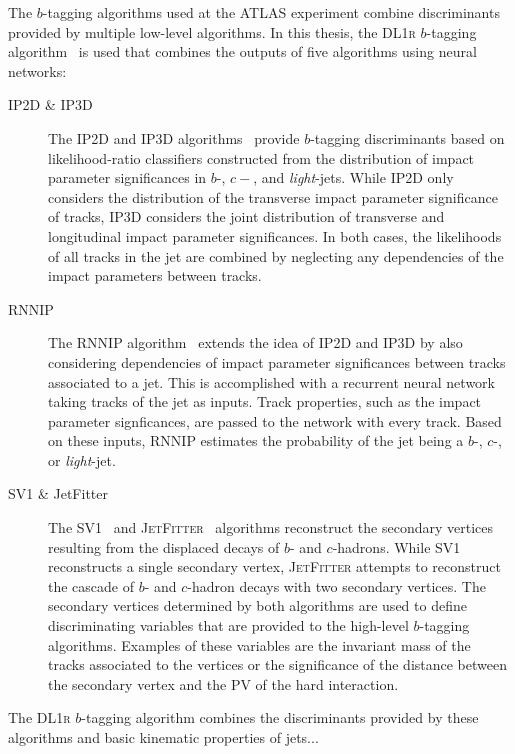 The $b$-tagging algorithms used at the ATLAS experiment combine discriminants
provided by multiple low-level algorithms. In this thesis, the \textsc{DL1r}
$b$-tagging algorithm~\cite{FTAG-2019-07-001} is used that combines the outputs
of five algorithms using neural networks:
\begin{description}

\item[IP2D \& IP3D] The \textsc{IP2D} and \textsc{IP3D}
  algorithms~\cite{ATL-PHYS-PUB-2017-013} provide $b$-tagging discriminants
  based on likelihood-ratio classifiers constructed from the distribution of
  impact parameter significances in $b$-, $c-$, and \emph{light}-jets. While
  \textsc{IP2D} only considers the distribution of the transverse impact
  parameter significance of tracks, \textsc{IP3D} considers the joint
  distribution of transverse and longitudinal impact parameter significances.
  In both cases, the likelihoods of all tracks in the jet are combined by
  neglecting any dependencies of the impact parameters between tracks.

\item[RNNIP] The \textsc{RNNIP} algorithm~\cite{ATL-PHYS-PUB-2017-003} extends
  the idea of \textsc{IP2D} and \textsc{IP3D} by also considering dependencies
  of impact parameter significances between tracks associated to a jet. This is
  accomplished with a recurrent neural network taking tracks of the jet as
  inputs. Track properties, such as the impact parameter signficances, are
  passed to the network with every track. Based on these inputs, \textsc{RNNIP}
  estimates the probability of the jet being a $b$-, $c$-, or \emph{light}-jet.

\item[SV1 \& JetFitter] The \textsc{SV1}~\cite{ATL-PHYS-PUB-2017-011} and
  \textsc{JetFitter}~\cite{ATL-PHYS-PUB-2018-025} algorithms reconstruct the
  secondary vertices resulting from the displaced decays of $b$- and
  $c$-hadrons. While \textsc{SV1} reconstructs a single secondary vertex,
  \textsc{JetFitter} attempts to reconstruct the cascade of $b$- and $c$-hadron
  decays with two secondary vertices. The secondary vertices determined by both
  algorithms are used to define discriminating variables that are provided to
  the high-level $b$-tagging algorithms. Examples of these variables are the
  invariant mass of the tracks associated to the vertices or the significance of
  the distance between the secondary vertex and the PV of the hard interaction.

\end{description}
The \textsc{DL1r} $b$-tagging algorithm combines the discriminants provided by
these algorithms and basic kinematic properties of jets...

